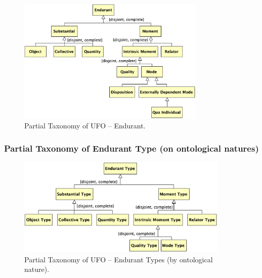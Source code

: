 \documentclass{article}
\newcommand{\BeginEndurantTaxonomy}{88}
\newcommand{\EndEndurantTaxonomy}{145}
\newcommand{\BeginEndurantTaxonomyOfNaturesBegin}{147}
\newcommand{\EndEndurantTaxonomyOfNaturesEnd}{192}
\begin{document}
\begin{figure}[ht]
    \centering
    \includegraphics[width=0.8\textwidth]{diagrams/Endurant_Diagram.png}
    \caption{Partial Taxonomy of UFO -- Endurant.}
    \label{fig:ufo_taxonomy_endurant}
\end{figure}



\subsubsection{Partial Taxonomy of Endurant Type (on ontological natures)}

\begin{figure}[ht]
    \centering
    \includegraphics[width=0.9\textwidth]{diagrams/Endurant_Type_Natures_Diagram.png}
    \caption{Partial Taxonomy of UFO -- Endurant Types (by ontological nature).}
    \label{fig:ufo_taxonomy_endurant_types_natures}
\end{figure}


\end{document}
